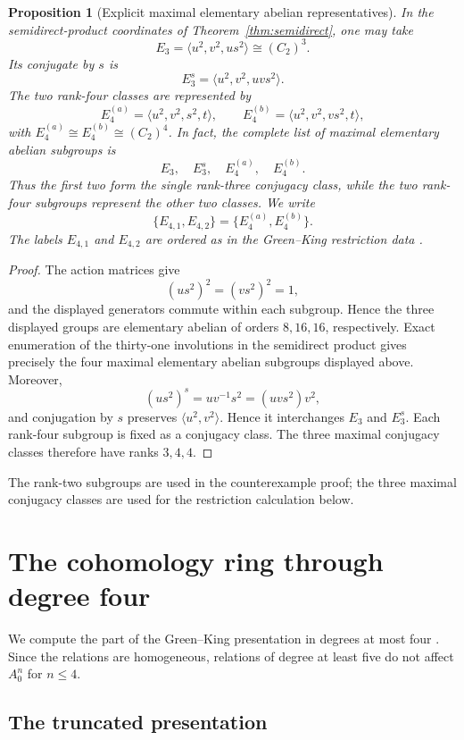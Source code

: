 \documentclass[11pt]{amsart}
\newtheorem{proposition}[theorem]{Proposition}
\theoremstyle{definition}
\theoremstyle{remark}
\begin{document}
\begin{proposition}[Explicit maximal elementary abelian representatives]
\label{prop:explicit-maximal-E}
In the semidirect-product coordinates of Theorem~\ref{thm:semidirect}, one may take
\[
E_3=\langle u^2,v^2,us^2\rangle\cong(C_2)^3.
\]
Its conjugate by \(s\) is
\[
E_3^s=\langle u^2,v^2,uvs^2\rangle.
\]
The two rank-four classes are represented by
\[
E_4^{(a)}=\langle u^2,v^2,s^2,t\rangle,
\qquad
E_4^{(b)}=\langle u^2,v^2,vs^2,t\rangle,
\]
with \(E_4^{(a)}\cong E_4^{(b)}\cong(C_2)^4\).  In fact, the complete list of maximal elementary abelian subgroups is
\[
E_3,\quad E_3^s,\quad E_4^{(a)},\quad E_4^{(b)}.
\]
Thus the first two form the single rank-three conjugacy class, while the two rank-four subgroups represent the other two classes.  We write
\[
\{E_{4,1},E_{4,2}\}=\{E_4^{(a)},E_4^{(b)}\}.
\]
The labels \(E_{4,1}\) and \(E_{4,2}\) are ordered as in the Green--King restriction data \cite{GreenKingDatabase}.
\end{proposition}

\begin{proof}
The action matrices give
\[
(us^2)^2=(vs^2)^2=1,
\]
and the displayed generators commute within each subgroup.  Hence the three displayed groups are elementary abelian of orders \(8,16,16\), respectively.  Exact enumeration of the thirty-one involutions in the semidirect product gives precisely the four maximal elementary abelian subgroups displayed above.  Moreover,
\[
(us^2)^s=uv^{-1}s^2=(uvs^2)v^2,
\]
and conjugation by \(s\) preserves \(\langle u^2,v^2\rangle\).  Hence it interchanges \(E_3\) and \(E_3^s\).  Each rank-four subgroup is fixed as a conjugacy class.  The three maximal conjugacy classes therefore have ranks \(3,4,4\).
\end{proof}

The rank-two subgroups are used in the counterexample proof; the three maximal conjugacy classes are used for the restriction calculation below.


\section{The cohomology ring through degree four}
\label{sec:lowdegree}

We compute the part of the Green--King presentation in degrees at most four \cite{GreenKingDatabase}.  Since the relations are homogeneous, relations of degree at least five do not affect \(A_0^n\) for \(n\leq4\).

\subsection{The truncated presentation}
\end{document}
